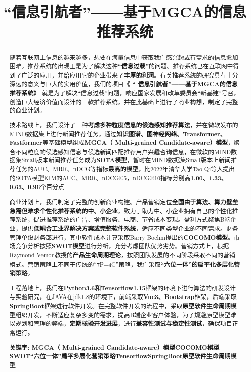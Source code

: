 \documentclass[withoutpreface,bwprint]{cumcmthesis} %
\title{“信息引航者”——基于MGCA的信息推荐系统}
\begin{document}
	
	\maketitle\thispagestyle{empty}
	\begin{abstract}
		随着互联网上信息的越来越多，想要在海量信息中获取我们感兴趣或有需求的信息愈加困难。推荐系统的出现正是为了解决这种\textbf{“信息过载”}的问题。推荐系统已在互联网中得到了广泛的应用，并给应用它的企业带来了\textbf{丰厚的利润}。有关推荐系统的研究具有十分深远的意义与巨大的实用价值，我们的项目\textbf{《 “ 信息引航者”——基于MGCA的信息推荐系统》 }就是为了解决“信息过载”问题，响应国家发展和改革委员会“新基建”号召，创造巨大经济价值而设计的一款推荐系统，并在此基础上进行了商业构想，制定了完整的商业计划。\par
		技术路线上，我们设计了一种\textbf{考虑多种粒度信息的候选感知推荐算法}，并在微软发布的MIND数据集上进行新闻推荐任务，通过\textbf{知识图谱、图神经网络、Transformer、Fastformer}等基础模型组成\textbf{MGCA（ Multi-grained Candidate-aware）模型}，聚合不同粒度的候选感知信息与候选新闻匹配推荐用户兴趣咨询信息，在微软的MIND数据集Small版本新闻推荐任务成为\textbf{SOTA模型}，暂时在MIND数据集Small版本上新闻推荐任务的AUC、MRR、nDCG等指标\textbf{最高的模型}，比2022年清华大学Tao Qi等人提出的SOTA模型KIM的AUC、MRR、nDCG@5，nDCG@10指标分别高\textbf{1.00、1.33、0.63、0.96}个百分点\par
		商业计划上，我们制定了完整的创新商业构建。产品营销定位\textbf{全国由于算法、算力壁垒急需但难求个性化推荐系统的中、小企业}，致力于助力中、小企业拥有自己的个性化推荐系统，促进推荐系统的广告、增值服务、电商、节省成本变现。盈利方式聚焦B端企业，提供\textbf{低耦合工业界解决方案或完整软件系统}，适应不同类型企业的不同需求。财务管理单设财务部进行，其中软件成本计算采取Barry Boehm提出的\textbf{COCOMO模型}。市场竞争分析按照\textbf{SWOT模型}进行分析，充分考虑团队优势劣势。营销方式上，根据Raymond Vemon教授的\textbf{产品生命周期理论}，按照团队发展的不同阶段采取不同的营销模式。营销策略上不同于传统的“7P+4C”策略，我们采取\textbf{“六位一体”的扁平化多层化营销策略}。\par
		工程落地上，我们在\textbf{Python3.6和Tensorflow1.15}框架的环境下进行算法的研发设计与实验研究，在JAVA在jdk1.8的环境下，前端采取\textbf{Vue3、Bootstrap}框架，后端采取\textbf{SpringBoot}框架进行软件开发。在完整软件开发的流程中，采取\textbf{原型软件生命周期模型}组织开发，不断适应复杂多变的需求，提高B端企业客户体验，为了规避原型模型难以规划和管理的弊端，\textbf{定期核验开发进展}，进行\textbf{兼容性测试与稳定性测试}，确保项目正常运行。\par
		\textbf	{关键字: MGCA（ Multi-grained Candidate-aware）模型\quad  COCOMO模型\quad  SWOT\quad  “六位一体”扁平多层化营销策略\quad   Tensorflow\quad SpringBoot\quad  原型软件生命周期模型\quad	}
	\end{abstract}
	\setcounter{page}{1}
	\tableofcontents
	\newpage
\end{document}
